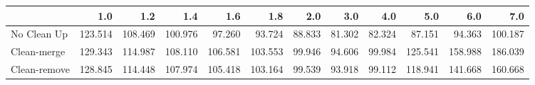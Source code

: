 \begin{tabular}{lrrrrrrrrrrr}
\toprule
{} &     1.0 &     1.2 &     1.4 &     1.6 &     1.8 &    2.0 &    3.0 &    4.0 &     5.0 &     6.0 &     7.0 \\
\midrule
No Clean Up  & 123.514 & 108.469 & 100.976 &  97.260 &  93.724 & 88.833 & 81.302 & 82.324 &  87.151 &  94.363 & 100.187 \\
Clean-merge  & 129.343 & 114.987 & 108.110 & 106.581 & 103.553 & 99.946 & 94.606 & 99.984 & 125.541 & 158.988 & 186.039 \\
Clean-remove & 128.845 & 114.448 & 107.974 & 105.418 & 103.164 & 99.539 & 93.918 & 99.112 & 118.941 & 141.668 & 160.668 \\
\bottomrule
\end{tabular}
